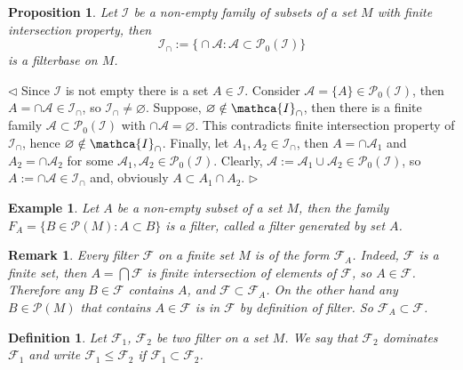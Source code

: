 \documentclass[12pt]{article}
\newtheorem{proposition}[theorem]{Proposition}
\newtheorem{remark}[theorem]{Remark}
\newtheorem{definition}[theorem]{Definition}
\newtheorem{example}[theorem]{Example}
\newenvironment{proof}{\par $\triangleleft$}{$\triangleright$}
\begin{document}
\begin{proposition} Let $\mathcal{I}$ be a non-empty family of subsets of a set $M$ with finite intersection property, then 
$$
\mathcal{I}_{\cap}:=\big\{\cap \mathcal{A} : \mathcal{A}\subset\mathcal{P}_0(\mathcal{I})\big\}
$$
is a filterbase on $M$.
\end{proposition} 
\begin{proof} Since $\mathcal{I}$ is not empty there is a set $A\in\mathcal{I}$. Consider $\mathcal{A}=\{A\}\in\mathcal{P}_0(\mathcal{I})$, then $A=\cap\mathcal{A}\in\mathcal{I}_{\cap}$, so $\mathcal{I}_{\cap}\neq\varnothing$. Suppose, $\varnothing \notin \mathca{I}_{\cap}$, then there is a finite family $\mathcal{A}\subset\mathcal{P}_0(\mathcal{I})$ with $\cap\mathcal{A}=\varnothing$. This contradicts finite intersection property of $\mathcal{I}_{\cap}$, hence $\varnothing \notin \mathca{I}_{\cap}$. Finally, let $A_1, A_2\in\mathcal{I}_{\cap}$, then $A=\cap\mathcal{A}_1$ and $A_2=\cap\mathcal{A}_2$ for some $\mathcal{A}_1,\mathcal{A}_2\in\mathcal{P}_0(\mathcal{I})$. Clearly, $\mathcal{A}:=\mathcal{A}_1\cup\mathcal{A}_2\in\mathcal{P}_0(\mathcal{I})$, so $A:=\cap\mathcal{A}\in\mathcal{I}_{\cap}$ and, obviously $A\subset A_1\cap A_2$.
\end{proof}

\begin{example}\label{ExFilterGenBySet} Let $A$ be a non-empty subset of a set $M$, then the family $F_A=\{B\in\mathcal{P}(M):A\subset B\}$ is a filter, called a filter generated by set $A$.
\end{example}

\begin{remark}\label{RemDescOfFiltersOnFiniteSets} Every filter $\mathcal{F}$ on a finite set $M$ is of the form $\mathcal{F}_{A}$. Indeed, $\mathcal{F}$ is a finite set, then $A=\bigcap\mathcal{F}$ is finite intersection of elements of $\mathcal{F}$, so $A\in\mathcal{F}$. Therefore any $B\in\mathcal{F}$ contains $A$, and $\mathcal{F}\subset\mathcal{F}_A$. On the other hand any $B\in\mathcal{P}(M)$ that contains $A\in\mathcal{F}$ is in $\mathcal{F}$ by definition of filter. So $\mathcal{F}_A\subset\mathcal{F}$.
\end{remark}


\begin{definition}\label{DefFilterComparsion} Let $\mathcal{F}_1$, $\mathcal{F}_2$ be two filter on a set $M$. We say that $\mathcal{F}_2$ dominates $\mathcal{F}_1$ and write $\mathcal{F}_1\leq \mathcal{F}_2$ if $\mathcal{F}_1\subset\mathcal{F}_2$.
\end{definition}
\end{document}
